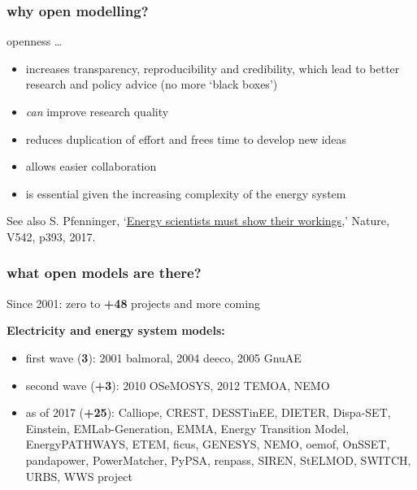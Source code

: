 \documentclass[12pt,aspectratio=169]{beamer}
\let\olditem\item
\renewcommand{\item}{%
\olditem\vspace{5pt}}
\begin{document}
\begin{frame}
  \frametitle{why open modelling?}

  openness \dots
  \begin{itemize}
  \item increases \alert{transparency}, \alert{reproducibility}
    and \alert{credibility}, which lead to better research and policy
    advice  (no more `black boxes')
  \item \emph{can} improve research \alert{quality}
  \item  reduces
    \alert{duplication of effort} and frees time  to develop
    \alert{new ideas}
  \item allows easier \alert{collaboration}
  \item is essential given the increasing \alert{complexity} of the energy system
  \end{itemize}

  \vspace{0.5cm}

  {\footnotesize See also S. Pfenninger, `\href{https://dx.doi.org/10.1038/542393a}{Energy scientists must show their workings},' Nature, V542, p393, 2017.}

\end{frame}







\begin{frame}
  \frametitle{what open models are there?}

  Since 2001: zero to {\bf +48} projects and more coming

  {\bf Electricity and energy system models:}
  \begin{itemize}
  \item first wave ({\bf 3}): 2001 balmoral, 2004 deeco, 2005 GnuAE
  \item second wave ({\bf +3}): 2010 OSeMOSYS, 2012 TEMOA, NEMO
   \item  as of 2017 ({\bf +25}): Calliope, CREST, DESSTinEE, DIETER, Dispa-SET, Einstein,
  EMLab-Generation, EMMA, Energy Transition Model, EnergyPATHWAYS,
  ETEM, ficus, GENESYS, NEMO, oemof, OnSSET, pandapower, PowerMatcher,
  PyPSA, renpass, SIREN, StELMOD, SWITCH, URBS, WWS project
  \end{itemize}
\end{frame}
\end{document}
